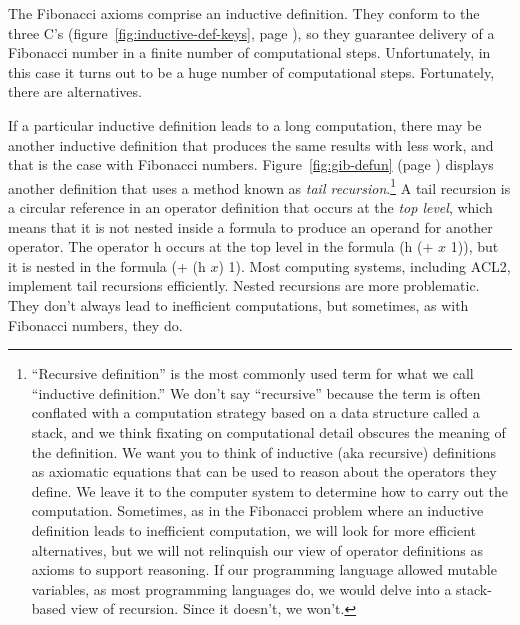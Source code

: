 The Fibonacci axioms comprise an
inductive definition.
They conform to the three C's
(figure~\ref{fig:inductive-def-keys}, page \pageref{fig:inductive-def-keys}),
so they guarantee delivery of a Fibonacci number
in a finite number of computational steps.
Unfortunately, in this case it turns out to be
a huge number of computational steps.
Fortunately, there are alternatives.

If a particular inductive definition leads to a long computation,
there may be another inductive definition that produces the same
results with less work,
and that is the case with Fibonacci numbers.
Figure~\ref{fig:gib-defun} (page \pageref{fig:gib-defun})
displays another definition that uses a method known as
\emph{tail recursion}.\footnote{``Recursive definition''
is the most commonly used term for what we call ``inductive definition.''
We don't say ``recursive'' because the term is often conflated
with a computation strategy based on a data structure called a stack,
and we think fixating on computational detail obscures the meaning
of the definition.
We want you to think of inductive (aka recursive)
definitions as axiomatic equations that can be used to reason about the
operators they define. We leave it to the computer system
to determine how to carry out the computation.
Sometimes, as in the Fibonacci problem
where an inductive definition leads to inefficient computation,
we will look for more efficient alternatives,
but we will not relinquish our view of operator definitions
as axioms to support reasoning. If our programming language allowed
mutable variables, as most programming languages do, we would
delve into a stack-based view of recursion.
Since it doesn't, we won't.}
A tail recursion is a circular reference in an operator definition
that occurs at the
\emph{top level},
which means that it is not nested
inside a formula to produce an operand for another operator.
The operator \textsf{h} occurs at the top level
in the formula \textsf{(h (+ $x$ 1))},
but it is nested in the formula \textsf{(+ (h $x$) 1)}.
Most computing systems, including ACL2,
implement tail recursions efficiently. Nested recursions are
more problematic. They don't always lead to inefficient computations,
but sometimes, as with Fibonacci numbers, they do.

